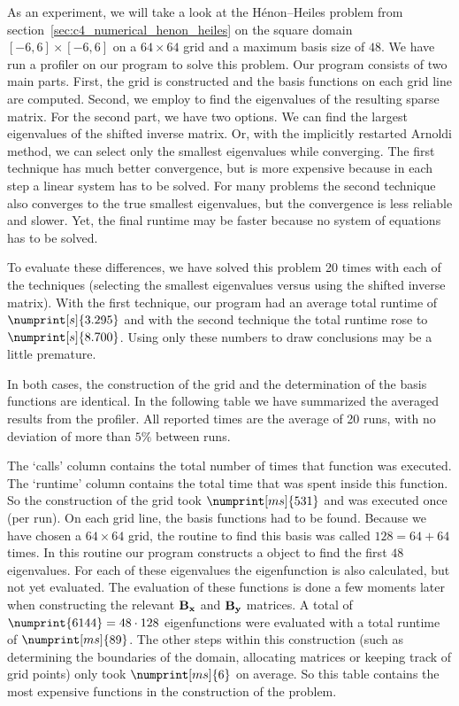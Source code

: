 As an experiment, we will take a look at the Hénon--Heiles problem from section~\ref{sec:c4_numerical_henon_heiles} on the square domain $[-6 , 6]\times [-6, 6]$ on a $64\times 64$ grid and a maximum basis size of $48$. We have run a profiler on our program to solve this problem. Our program consists of two main parts. First, the grid is constructed and the basis functions on each grid line are computed. Second, we employ \spectra{} to find the eigenvalues of the resulting sparse matrix. For the second part, we have two options. We can find the largest eigenvalues of the shifted inverse matrix. Or, with the implicitly restarted Arnoldi method, we can select only the smallest eigenvalues while converging. The first technique has much better convergence, but is more expensive because in each step a linear system has to be solved. For many problems the second technique also converges to the true smallest eigenvalues, but the convergence is less reliable and slower. Yet, the final runtime may be faster because no system of equations has to be solved.

To evaluate these differences, we have solved this problem 20 times with each of the techniques (selecting the smallest eigenvalues versus using the shifted inverse matrix). With the first technique, our program had an average total runtime of $\numprint[s]{3.295}$ and with the second technique the total runtime rose to $\numprint[s]{8.700}$. Using only these numbers to draw conclusions may be a little premature.

In both cases, the construction of the grid and the determination of the basis functions are identical. In the following table we have summarized the averaged results from the profiler. All reported times are the average of 20 runs, with no deviation of more than $5\%$ between runs.

\begin{center}
    
\end{center}

The `calls' column contains the total number of times that function was executed. The `runtime' column contains the total time that was spent inside this function. So the construction of the grid took $\numprint[ms]{531}$ and was executed once (per run). On each grid line, the basis functions had to be found. Because we have chosen a $64 \times 64$ grid, the routine to find this basis was called $128 = 64 + 64$ times. In this routine our program constructs a \matslise{} object to find the first $48$ eigenvalues. For each of these eigenvalues the eigenfunction is also calculated, but not yet evaluated. The evaluation of these functions is done a few moments later when constructing the relevant $\vb{B_x}$ and $\vb{B_y}$ matrices. A total of $\numprint{6144} = 48 \cdot 128$ eigenfunctions were evaluated with a total runtime of $\numprint[ms]{89}$. The other steps within this construction (such as determining the boundaries of the domain, allocating matrices or keeping track of grid points) only took $\numprint[ms]{6}$ on average. So this table contains the most expensive functions in the construction of the problem.

